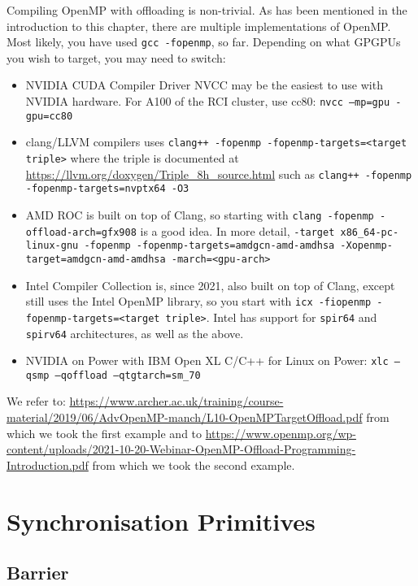 Compiling OpenMP with offloading is non-trivial. As has been mentioned in the introduction to this chapter, there are multiple implementations of OpenMP. Most likely, you have used \verb|gcc -fopenmp|, so far. Depending on what GPGPUs you wish to target, you may need to switch:



\begin{itemize}
\item NVIDIA CUDA Compiler Driver NVCC may be the easiest to use with NVIDIA hardware. For A100 of the RCI cluster, use cc80: \verb|nvcc –mp=gpu -gpu=cc80|
\item clang/LLVM compilers uses \verb|clang++ -fopenmp -fopenmp-targets=<target triple>| where the triple is documented at \url{https://llvm.org/doxygen/Triple_8h_source.html} such as \verb|clang++ -fopenmp -fopenmp-targets=nvptx64 -O3|
\item AMD ROC is built on top of Clang, so starting with \verb|clang -fopenmp -offload-arch=gfx908| is a good idea. In more detail,  
\verb|-target x86_64-pc-linux-gnu -fopenmp -fopenmp-targets=amdgcn-amd-amdhsa -Xopenmp-target=amdgcn-amd-amdhsa -march=<gpu-arch>|
\item Intel Compiler Collection is, since 2021, also built on top of Clang, except still uses the Intel OpenMP library, so you start with \verb|icx -fiopenmp -fopenmp-targets=<target triple>|. Intel has support for \verb|spir64| and \verb|spirv64| architectures, as well as the above.
\item NVIDIA on Power with IBM Open XL C/C++ for Linux on Power: \verb|xlc –qsmp –qoffload –qtgtarch=sm_70|
\end{itemize} 

We refer to:
\url{https://www.archer.ac.uk/training/course-material/2019/06/AdvOpenMP-manch/L10-OpenMPTargetOffload.pdf}
from which we took the first example and to \url{https://www.openmp.org/wp-content/uploads/2021-10-20-Webinar-OpenMP-Offload-Programming-Introduction.pdf} from which we took the second example. 

\section{Synchronisation Primitives}

\subsection{Barrier}

